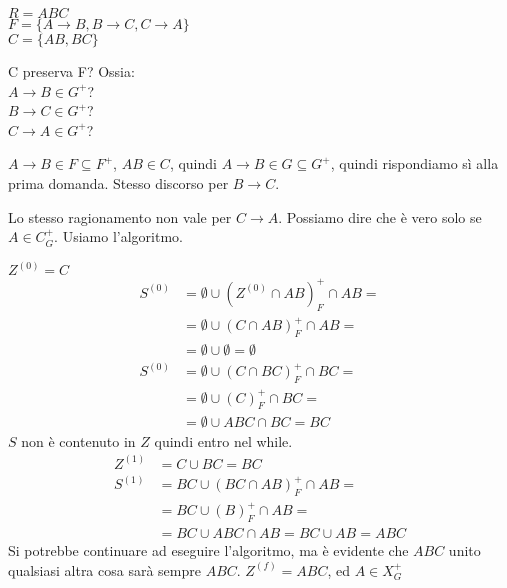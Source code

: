 \begin{exmp}
$R = ABC$ \\
$F = \{A \to B, B \to C, C \to A\}$ \\
$C = \{AB, BC\}$

C preserva F? Ossia: \\
$A \to B \in G^{+}$? \\
$B \to C \in G^{+}$? \\
$C \to A \in G^{+}$?

$A \to B \in F \subseteq F^{+}$, $AB \in C$, quindi $A \to B \in G \subseteq G^{+}$, quindi rispondiamo s\`i alla prima domanda. Stesso discorso per $B \to C$.

Lo stesso ragionamento non vale per $C \to A$. Possiamo dire che \`e vero solo se $A \in C^{+}_{G}$. Usiamo l'algoritmo.

$Z^{(0)} = C$
\begin{align*}
S^{(0)} &= \emptyset \cup (Z^{(0)} \cap AB)^{+}_{F} \cap AB = \\
&= \emptyset \cup (C \cap AB)^{+}_{F} \cap AB = \\
&= \emptyset \cup \emptyset = \emptyset \\
S^{(0)} &= \emptyset \cup (C \cap BC)^{+}_{F} \cap BC = \\
&= \emptyset \cup (C)^{+}_{F} \cap BC = \\
&= \emptyset \cup ABC \cap BC = BC
\end{align*}
$S$ non \`e contenuto in $Z$ quindi entro nel while.
\begin{align*}
Z^{(1)} &= C \cup BC = BC \\
S^{(1)} &= BC \cup (BC \cap AB)^{+}_{F} \cap AB = \\
&= BC \cup (B)^{+}_{F} \cap AB = \\
&= BC \cup ABC \cap AB = BC \cup AB = ABC
\end{align*}
Si potrebbe continuare ad eseguire l'algoritmo, ma \`e evidente che $ABC$ unito qualsiasi altra cosa sar\`a sempre $ABC$. $Z^{(f)} = ABC$, ed $A \in X^{+}_{G}$
\end{exmp}

